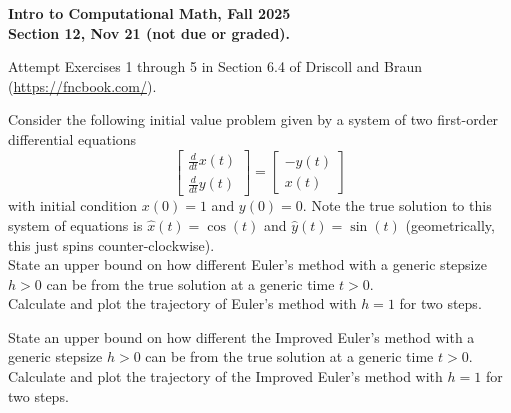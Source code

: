 \documentclass[11pt]{article}
\begin{document}
\begin{center}
{\bf Intro to Computational Math, Fall 2025\\
Section 12, Nov 21 (not due or graded).\\
}
\end{center}


 Attempt Exercises 1 through 5 in Section 6.4 of Driscoll and Braun (\url{https://fncbook.com/}).

\vskip2cm

 Consider the following initial value problem given by a system of two first-order differential equations
$$
\begin{bmatrix}
    \frac{d}{dt} x(t)\\ \frac{d}{dt} y(t) 
\end{bmatrix} = \begin{bmatrix}
    -y(t)\\ x(t) 
\end{bmatrix}
$$
with initial condition $x(0)=1$ and $y(0)=0$. Note the true solution to this system of equations is $\hat x(t)=\cos(t)$ and $\hat y(t) = \sin(t)$ (geometrically, this just spins counter-clockwise).\\

State an upper bound on how different Euler's method with a generic stepsize $h>0$ can be from the true solution at a generic time $t>0$. \\ 
Calculate and plot the trajectory of Euler's method with $h=1$ for two steps.

\vskip 3cm


 State an upper bound on how different the Improved Euler's method with a generic stepsize $h>0$ can be from the true solution at a generic time $t>0$. \\
Calculate and plot the trajectory of the Improved Euler's method with $h=1$ for two steps.
\end{document}
